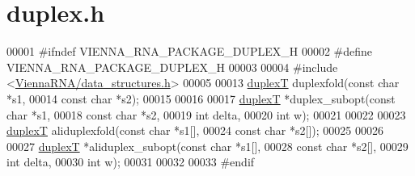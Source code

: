 \hypertarget{duplex_8h_source}{}\section{duplex.\+h}
\label{duplex_8h_source}

\begin{DoxyCode}
00001 \textcolor{preprocessor}{#ifndef VIENNA\_RNA\_PACKAGE\_DUPLEX\_H}
00002 \textcolor{preprocessor}{#define VIENNA\_RNA\_PACKAGE\_DUPLEX\_H}
00003 
00004 \textcolor{preprocessor}{#include <\hyperlink{data__structures_8h}{ViennaRNA/data\_structures.h}>}
00005 
00013 \hyperlink{group__data__structures_structduplexT}{duplexT} duplexfold(\textcolor{keyword}{const} \textcolor{keywordtype}{char} *s1,
00014                    \textcolor{keyword}{const} \textcolor{keywordtype}{char} *s2);
00015 
00016 
00017 \hyperlink{group__data__structures_structduplexT}{duplexT} *duplex\_subopt(\textcolor{keyword}{const} \textcolor{keywordtype}{char} *s1,
00018                        \textcolor{keyword}{const} \textcolor{keywordtype}{char} *s2,
00019                        \textcolor{keywordtype}{int}        delta,
00020                        \textcolor{keywordtype}{int}        w);
00021 
00022 
00023 \hyperlink{group__data__structures_structduplexT}{duplexT} aliduplexfold(\textcolor{keyword}{const} \textcolor{keywordtype}{char}  *s1[],
00024                       \textcolor{keyword}{const} \textcolor{keywordtype}{char}  *s2[]);
00025 
00026 
00027 \hyperlink{group__data__structures_structduplexT}{duplexT} *aliduplex\_subopt(\textcolor{keyword}{const} \textcolor{keywordtype}{char}  *s1[],
00028                           \textcolor{keyword}{const} \textcolor{keywordtype}{char}  *s2[],
00029                           \textcolor{keywordtype}{int}         delta,
00030                           \textcolor{keywordtype}{int}         w);
00031 
00032 
00033 \textcolor{preprocessor}{#endif}
\end{DoxyCode}
